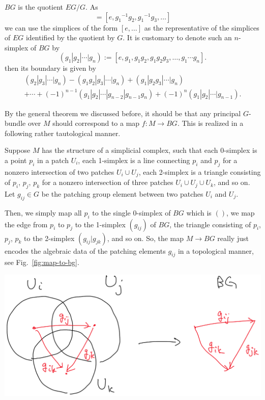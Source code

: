 \documentclass[12pt]{article}
\numberwithin{equation}{section}
\numberwithin{figure}{section}
\theoremstyle{remark}
\renewenvironment{figure}[1][]{
  \begin{originalfigure}[#1]
    \begin{mdframed}[linecolor=black!0,backgroundcolor=black!1]
}{
    \end{mdframed}
  \end{originalfigure}
}
\begin{document}
$BG$ is the quotient $EG/G$. As \begin{equation}
[g_1,g_2,\ldots] = [e, g_1{}^{-1} g_2, g_1{}^{-1} g_3,\ldots]
\end{equation}
we can  use the simplices of the form $[e,\ldots]$ as the representative 
of the simplices of $EG$ identified by the quotient by $G$.
It is customary to denote such an $n$-simplex of $BG$ by \begin{equation}
(g_1|g_2|\cdots|g_n) := [e,g_1,g_1g_2,g_1g_2g_3,\ldots, g_1\cdots g_n].
\end{equation}
then its boundary is given by \begin{multline}
(g_2|g_3|\cdots|g_n) - (g_1g_2|g_3|\cdots|g_n) + (g_1|g_2g_3|\cdots |g_n)\\
+\cdots + (-1)^{n-1}(g_1|g_2|\cdots |g_{n-2}|g_{n-1}g_n)+  (-1)^n(g_1|g_2|\cdots|g_{n-1}).
\label{BG-boundary-map}
\end{multline}

By the general theorem we discussed before, it should be that
any principal $G$-bundle over $M$ should correspond to a map $f:M\to BG$.
This is realized in a following rather tautological manner.

Suppose $M$ has the structure of a simplicial complex,
such that each 0-simplex is a point $p_i$ in a patch $U_i$,
each 1-simplex is a line connecting $p_i$ and $p_j$ for a nonzero intersection of two patches $U_i\cup U_j$,
each 2-simplex is a triangle consisting of $p_i$, $p_j$, $p_k$ for a nonzero intersection of three patches $U_i\cup U_j\cup U_k$,
and so on. 
Let $g_{ij}\in G$ be the patching group element between two patches $U_i$ and $U_j$.

Then, we simply map all $p_i$ to the single 0-simplex of $BG$ which is $()$,
we map the edge from $p_i$ to $p_j$ to the 1-simplex $(g_{ij})$ of $BG$,
the triangle consisting of $p_i$, $p_j$, $p_k$ to the 2-simplex $(g_{ij}|g_{jk})$,
and so on.
So, the map $M\to BG$ really just encodes the algebraic data of the patching elements $g_{ij}$ in a topological manner, see Fig.~\ref{fig:map-to-bg}.

\begin{figure}[h]
\centering
 \includegraphics[scale=.2]{map-to-bg.png} 
\caption{A principal $G$-bundle defined by patches 
and a map to $BG$. \label{fig:map-to-bg}}
\end{figure}
\end{document}
